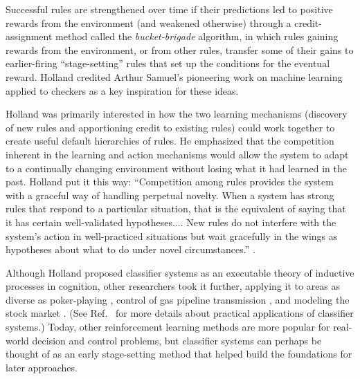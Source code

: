 \documentclass{sig-alternate}
\begin{document}
Successful rules are strengthened over time if their predictions led
to positive rewards from the environment (and weakened otherwise)
through a credit-assignment method called the \emph{bucket-brigade}
algorithm, in which rules gaining rewards from the environment, or from
other rules, transfer some of their gains to earlier-firing
``stage-setting'' rules that set up the conditions for the eventual
reward. Holland credited Arthur Samuel's pioneering work on machine
learning applied to checkers \cite{Samuel1959} as a key inspiration for these ideas.

Holland was primarily interested in how the two
learning mechanisms (discovery of new rules and apportioning credit to
existing rules) could work together to create 
useful default hierarchies of rules.  He emphasized that the
competition inherent in the learning and action mechanisms would allow
the system to adapt to a continually changing environment without
losing what it had learned in the past.  Holland put it this way:
``Competition among rules provides the system with a graceful way of
handling perpetual novelty.  When a system has strong rules that
respond to a particular situation, that is the equivalent of saying
that it has certain well-validated hypotheses.... New rules do not
interfere with the system's action in well-practiced situations but
wait gracefully in the wings as hypotheses about what to do under
novel circumstances.'' \cite{Holland1992}.

Although Holland proposed classifier systems as 
an executable theory of inductive processes in cognition, other researchers took it further, 
applying it to areas as diverse as poker-playing \cite{Smith1980},
control of gas pipeline transmission \cite{Goldberg1983}, and modeling
the stock market \cite{Palmer1994}.  (See Ref.~\cite{Booker1989} for
more details about practical applications of classifier systems.)
Today, other reinforcement learning methods are more popular for
real-world decision and control problems, but classifier systems can
perhaps be thought of as an early stage-setting method that helped
build the foundations for later approaches.
\end{document}
